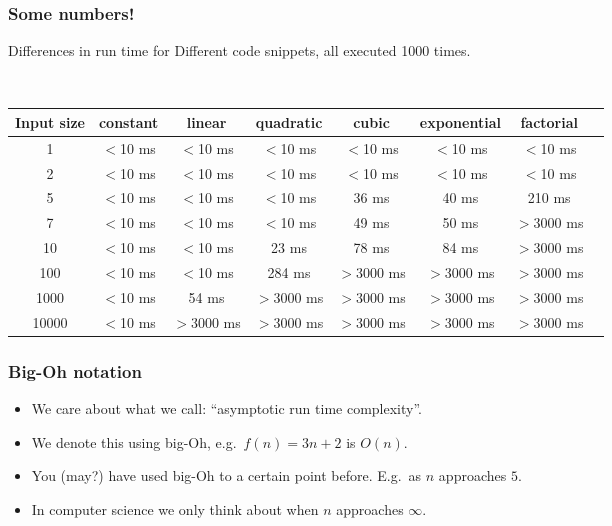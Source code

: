 \begin{frame}
	\frametitle{Some numbers!}
	
Differences in run time for	Different code snippets, all executed 1000 times.

		\hfill\\
		\begin{tabular}{c | c c c c c c c}
			\scriptsize
			Input size & constant & linear & quadratic & cubic & exponential & factorial\\
			\midrule
			
			1 & $<$10 ms & $<$10 ms & $<$10 ms & $<$10 ms & $<$10 ms & $<$10 ms\\
			2 & $<$10 ms & $<$10 ms & $<$10 ms & $<$10 ms & $<$10 ms & $<$10 ms\\
			
			5 & $<$10 ms & $<$10 ms & $<$10 ms & 36 ms & 40 ms & 210 ms\\
			
			7 & $<$10 ms & $<$10 ms & $<$10 ms & 49 ms & 50 ms & \alert{$>$3000 ms} \\
			
			10 & $<$10 ms & $<$10 ms & 23 ms & 78 ms & 84 ms & \alert{$>$3000 ms}\\
			
			100 & $<$10 ms & $<$10 ms & 284 ms & \alert{$>$3000 ms} & \alert{$>$3000 ms} & \alert{$>$3000 ms} \\
			
			1000 & $<$10 ms & 54 ms & \alert{$>$3000 ms} &\alert{$>$3000 ms} & \alert{$>$3000 ms} & \alert{$>$3000 ms} \\
			
			10000 & $<$10 ms &  \alert{$>$3000 ms} &\alert{$>$3000 ms} &\alert{$>$3000 ms} & \alert{$>$3000 ms} & \alert{$>$3000 ms} \\
		\end{tabular}
\end{frame}

\begin{frame}
	\frametitle{Big-Oh notation}

	\begin{itemize}
		\item We care about what we call: ``asymptotic run time complexity''.
		\item We denote this using big-Oh, e.g.\ $f(n) = 3n + 2$ is $O(n)$.

		\item You (may?) have used big-Oh to a certain point before. E.g.\ as $n$ approaches $5$.
			
		\item In computer science we only think about when $n$ approaches $\infty$.
	\end{itemize}
\end{frame}

